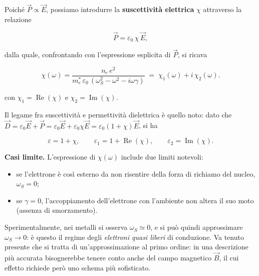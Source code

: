 Poiché \( \vec{P} \propto \vec{E} \), possiamo introdurre la \textbf{suscettività elettrica} \( \chi \) attraverso la relazione

\begin{equation}
    \vec{P} = \varepsilon_0 \, \chi \, \vec{E},
\end{equation}

dalla quale, confrontando con l'espressione esplicita di \( \vec{P} \), si ricava

\begin{importantbox}
    \begin{equation}
        \chi(\omega) = \frac{n_e \, e^{2}}{m_e^{*} \, \varepsilon_0 \, (\omega_S^{2} - \omega^{2} - i \omega \gamma)} \;=\; \chi_1(\omega) + i \, \chi_2(\omega).
    \end{equation}
\end{importantbox}

con \( \chi_1 = \operatorname{Re}(\chi) \) e \( \chi_2 = \operatorname{Im}(\chi) \).

Il legame fra suscettività e permettività dielettrica è quello noto: dato che \( \vec{D} = \varepsilon_0 \vec{E} + \vec{P} = \varepsilon_0 \vec{E} + \varepsilon_0 \chi \vec{E} = \varepsilon_0 (1 + \chi) \vec{E} \), si ha

\begin{equation}
    \varepsilon = 1 + \chi, \qquad \varepsilon_1 = 1 + \operatorname{Re}(\chi), \qquad \varepsilon_2 = \operatorname{Im}(\chi).
\end{equation}

\textbf{Casi limite.} L'espressione di \( \chi(\omega) \) include due limiti notevoli:

\begin{itemize}
    \item se l'elettrone è così esterno da non risentire della forza di richiamo del nucleo, \( \omega_S = 0 \);
    \item se \( \gamma = 0 \), l'accoppiamento dell'elettrone con l'ambiente non altera il suo moto (assenza di smorzamento).
\end{itemize}

Sperimentalmente, nei metalli si osserva \( \omega_S \simeq 0 \), e si può quindi approssimare \( \omega_S \to 0 \): è questo il regime degli \emph{elettroni quasi liberi} di conduzione. Va tenuto presente che si tratta di un'approssimazione al primo ordine: in una descrizione più accurata bisognerebbe tenere conto anche del campo magnetico \( \vec{B} \), il cui effetto richiede però uno schema più sofisticato.

